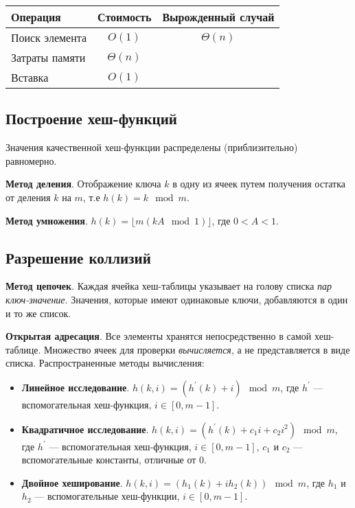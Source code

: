 \begin{center}
  \begin{tabular}{lcc}
    \toprule
    Операция & Стоимость & Вырожденный случай \\
    \midrule
    Поиск элемента & $O(1)$ & $\Theta(n)$ \\
    Затраты памяти & $\Theta(n)$ & \\
    Вставка & $O(1)$ & \\
    \bottomrule
  \end{tabular}
\end{center}

\subsection{Построение хеш-функций}
Значения качественной хеш-функции распределены (приблизительно) равномерно.

\textbf{Метод деления}. Отображение ключа $k$ в одну из ячеек путем получения остатка от деления $k$ на $m$, т.е $h(k) = k \mod m$.

\textbf{Метод умножения}. $h(k) = \lfloor m (kA \mod 1) \rfloor$, где $0 < A < 1$.

\subsection{Разрешение коллизий}
\textbf{Метод цепочек}. Каждая ячейка хеш-таблицы указывает на голову списка \emph{пар ключ-значение}. Значения, которые имеют одинаковые ключи, добавляются в один и то же список.

\textbf{Открытая адресация}. Все элементы хранятся непосредственно в самой хеш-таблице. Множество ячеек для проверки \emph{вычисляется}, а не представляется в виде списка. Распространенные методы вычисления:
\begin{itemize}
  \item \textbf{Линейное исследование}. $h(k, i) = (h^{'}(k) + i) \mod m$, где $h^{'}$ --- вспомогательная хеш-функция, $i \in [0, m -1 ]$.
  \item \textbf{Квадратичное исследование}. $h(k, i) = (h^{'}(k) + c_1i + c_2i^2) \mod m$, где $h^{'}$ --- вспомогательная хеш-функция, $i \in [0, m -1 ]$, $c_1$ и $c_2$ --- вспомогательные константы, отличные от $0$.
  \item \textbf{Двойное хеширование}. $h(k, i) = (h_1(k) + ih_2(k)) \mod m$, где $h_1$ и $h_2$ --- вспомогательные хеш-функции, $i \in [0, m -1 ]$.
\end{itemize}

